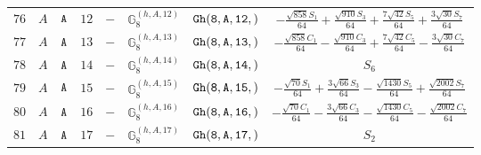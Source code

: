\documentclass[fleqn,8pt]{jsarticle}
\begin{document}
\begin{table}[ht!]
\begin{center}
\begin{tabular}{cccccccc}
$ 76 $ & $ A $ & $ {\tt A} $ & $ 12 $ & $ - $ & $ \mathbb{G}_{8}^{(h,A,12)} $ & $ {\tt Gh(8,A,12,)} $ & $ - \frac{\sqrt{858} S_{1}}{64} + \frac{\sqrt{910} S_{3}}{64} + \frac{7 \sqrt{42} S_{5}}{64} + \frac{3 \sqrt{30} S_{7}}{64} $ \\
$ 77 $ & $ A $ & $ {\tt A} $ & $ 13 $ & $ - $ & $ \mathbb{G}_{8}^{(h,A,13)} $ & $ {\tt Gh(8,A,13,)} $ & $ - \frac{\sqrt{858} C_{1}}{64} - \frac{\sqrt{910} C_{3}}{64} + \frac{7 \sqrt{42} C_{5}}{64} - \frac{3 \sqrt{30} C_{7}}{64} $ \\
$ 78 $ & $ A $ & $ {\tt A} $ & $ 14 $ & $ - $ & $ \mathbb{G}_{8}^{(h,A,14)} $ & $ {\tt Gh(8,A,14,)} $ & $ S_{6} $ \\
$ 79 $ & $ A $ & $ {\tt A} $ & $ 15 $ & $ - $ & $ \mathbb{G}_{8}^{(h,A,15)} $ & $ {\tt Gh(8,A,15,)} $ & $ - \frac{\sqrt{70} S_{1}}{64} + \frac{3 \sqrt{66} S_{3}}{64} - \frac{\sqrt{1430} S_{5}}{64} + \frac{\sqrt{2002} S_{7}}{64} $ \\
$ 80 $ & $ A $ & $ {\tt A} $ & $ 16 $ & $ - $ & $ \mathbb{G}_{8}^{(h,A,16)} $ & $ {\tt Gh(8,A,16,)} $ & $ - \frac{\sqrt{70} C_{1}}{64} - \frac{3 \sqrt{66} C_{3}}{64} - \frac{\sqrt{1430} C_{5}}{64} - \frac{\sqrt{2002} C_{7}}{64} $ \\
$ 81 $ & $ A $ & $ {\tt A} $ & $ 17 $ & $ - $ & $ \mathbb{G}_{8}^{(h,A,17)} $ & $ {\tt Gh(8,A,17,)} $ & $ S_{2} $ \\
 \hline \hline
\end{tabular}
\end{center}
\end{table}
\end{document}
